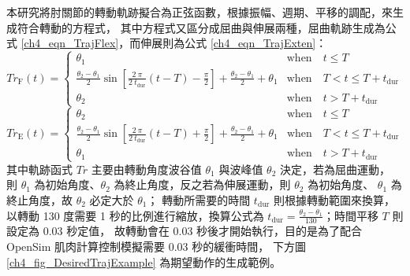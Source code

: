 本研究將肘關節的轉動軌跡擬合為正弦函數，根據振幅、週期、平移的調配，來生成符合轉動的方程式，
其中方程式又區分成屈曲與伸展兩種，屈曲軌跡生成為公式 \ref{ch4_eqn_TrajFlex}，而伸展則為公式 \ref{ch4_eqn_TrajExten}：
\begin{equation}
    \mathit{Tr}_\mathrm{F}(t) =
    \begin{cases}
        \theta_1 & \text{when} \quad t \leq T \\
        \frac{\theta_2 - \theta_1}{2} \sin[\frac{2 \ \pi}{2 \ t_\mathrm{dur}} (t-T) - \frac{\pi}{2}]
         + \frac{\theta_2 - \theta_1}{2} + \theta_1 & \text{when} \quad T < t \leq T + t_\mathrm{dur} \\
        \theta_2 & \text{when} \quad t > T + t_\mathrm{dur}
    \end{cases}
    \label{ch4_eqn_TrajFlex}
\end{equation}
\begin{equation}
    \mathit{Tr}_\mathrm{E}(t) =
    \begin{cases}
        \theta_2  & \text{when} \quad t \leq T \\
        \frac{\theta_2 - \theta_1}{2} \sin[\frac{2 \ \pi}{2 \ t_\mathrm{dur}} (t-T) + \frac{\pi}{2}]
         + \frac{\theta_2 - \theta_1}{2} + \theta_1 & \text{when} \quad T < t \leq T + t_\mathrm{dur} \\
        \theta_1  & \text{when} \quad t > T + t_\mathrm{dur}
    \end{cases}
    \label{ch4_eqn_TrajExten}
\end{equation}
其中軌跡函式 $\mathit{Tr}$ 主要由轉動角度波谷值 $\theta_1$ 與波峰值 $\theta_2$ 決定，若為屈曲運動，
則 $\theta_1$ 為初始角度、$\theta_2$ 為終止角度，反之若為伸展運動，則 $\theta_2$ 為初始角度、
$\theta_1$ 為終止角度，故 $\theta_2$ 必定大於 $\theta_1$；
轉動所需要的時間 $t_\mathrm{dur}$ 則根據轉動範圍來換算，以轉動 130 度需要 1 秒的比例進行縮放，換算公式為
$t_\mathrm{dur} = \frac{\theta_2 - \theta_1}{130}$；時間平移 $T$ 則設定為 0.03 秒定值，
故轉動會在 0.03 秒後才開始執行，目的是為了配合 OpenSim 肌肉計算控制模擬需要 0.03 秒的緩衝時間，
下方圖 \ref{ch4_fig_DesiredTrajExample} 為期望動作的生成範例。

\clearpage

